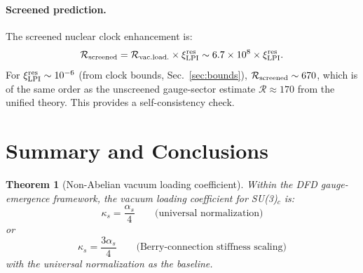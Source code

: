 \documentclass[11pt,letterpaper]{article}
\newtheorem{theorem}{Theorem}
\theoremstyle{definition}
\begin{document}
\paragraph{Screened prediction.}
The screened nuclear clock enhancement is:
\begin{equation}
\mathcal{R}_{\rm screened} = \mathcal{R}_{\rm vac.load.}
\times \xi_{\rm LPI}^{\rm res}
\sim 6.7 \times 10^8 \times \xi_{\rm LPI}^{\rm res}.
\end{equation}
For $\xi_{\rm LPI}^{\rm res} \sim 10^{-6}$ (from clock bounds,
Sec.~\ref{sec:bounds}), $\mathcal{R}_{\rm screened} \sim 670$,
which is of the same order as the unscreened gauge-sector estimate
$\mathcal{R} \approx 170$ from the unified theory.  This provides
a self-consistency check.

\section{Summary and Conclusions}\label{sec:summary}

\begin{theorem}[Non-Abelian vacuum loading coefficient]
\label{thm:kappa-s}
Within the DFD gauge-emergence framework, the vacuum loading
coefficient for SU(3)$_c$ is:
\begin{equation}
\kappa_s = \frac{\alpha_s}{4} \qquad \text{(universal normalization)}
\end{equation}
or
\begin{equation}
\kappa_s = \frac{3\alpha_s}{4} \qquad
\text{(Berry-connection stiffness scaling)}
\end{equation}
with the universal normalization as the baseline.
\end{theorem}
\end{document}
